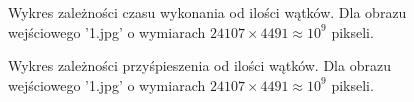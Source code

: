 \documentclass[a4paper,12pt]{article}
\begin{document}
\begin{figure}

	\begin{center}
 		   		 		
	\end{center}
	
    \caption{Wykres zależności czasu wykonania od ilości wątków.
     Dla obrazu wejściowego '1.jpg' o wymiarach \(24107 \times 4491 \approx 10^9\) pikseli.}
\end{figure}


\begin{figure}

	\begin{center}
 		   		 		
	\end{center}
	
    \caption{Wykres zależności przyśpieszenia od ilości wątków.
     Dla obrazu wejściowego '1.jpg' o wymiarach \(24107 \times 4491 \approx 10^9\) pikseli.}
\end{figure}
\end{document}
